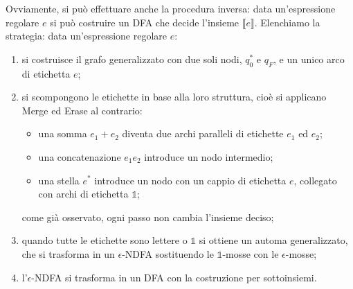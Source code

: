 \begin{rema}
Ovviamente, si può effettuare anche la procedura inversa:
data un'espressione regolare $e$ si può costruire un DFA che decide
l'insieme $\llbracket e \rrbracket$.
Elenchiamo la strategia: data un'espressione regolare $e$:

\begin{enumerate}
    \item si costruisce il grafo generalizzato con due soli nodi,
          $q_0^*$ e $q_F$, e un unico arco di etichetta $e$;
    \item si scompongono le etichette in base alla loro struttura,
          cioè si applicano Merge ed Erase al contrario:
          \begin{itemize}
              \item una somma $e_1+e_2$ diventa due archi paralleli di
                    etichette $e_1$ ed $e_2$;
              \item una concatenazione $e_1e_2$ introduce un nodo
                    intermedio;
              \item una stella $e^*$ introduce un nodo con un cappio di
                    etichetta $e$, collegato con archi di etichetta
                    $\mathbb 1$;
          \end{itemize}
          come già osservato, ogni passo non cambia l'insieme deciso;
    \item quando tutte le etichette sono lettere o $\mathbb 1$ si ottiene
          un automa generalizzato, che si trasforma in un
          $\epsilon$-NDFA sostituendo le $\mathbb 1$-mosse con le
          $\epsilon$-mosse;
    \item l'$\epsilon$-NDFA si trasforma in un DFA con la costruzione
          per sottoinsiemi.
\end{enumerate}
\end{rema}